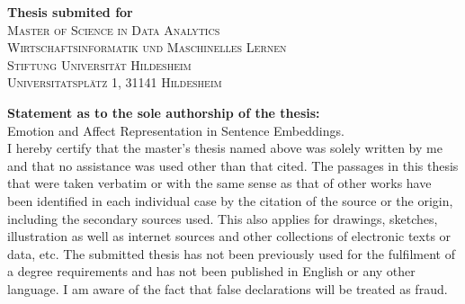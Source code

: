 \documentclass[a4paper,12pt]{report}
\begin{document}
\begin{titlepage}
{ \large \bfseries Thesis submited for}\\  %
\vspace{0.3cm}
\textsc{\Large Master of Science in Data Analytics}\\%
\vspace{1cm}
\textsc{\large Wirtschaftsinformatik und Maschinelles Lernen}\\ %
\vspace{0.3cm}
\textsc{\large Stiftung Universität Hildesheim}\\ %
\vspace{0.3cm}
\textsc{\large Universitatsplätz 1, 31141 Hildesheim}\\ %
\vspace{0.3cm}


\vfill %

\end{titlepage}


\setcounter{secnumdepth}{1}


\noindent \textbf{Statement as to the sole authorship of the thesis:}
\vspace{0.4cm}
\\Emotion and Affect Representation in Sentence Embeddings.\\
I hereby certify that the master's thesis named above was solely written by me and that no assistance was used other than that cited. The passages in this thesis that were taken verbatim or with the same sense as that of other works have been identified in each individual case by the citation of the source or the origin, including the secondary sources used. This also applies for drawings, sketches, illustration as well as internet sources and other collections of electronic texts or data, etc. The submitted thesis has not been previously used for the fulfilment of a degree requirements and has not been published in English or any other language. I am aware of the fact that false declarations will be treated as fraud.
\vspace{7cm}
\end{document}
